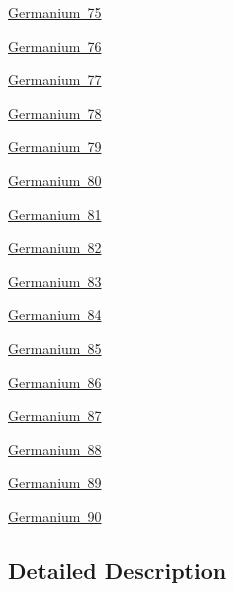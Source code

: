 \begin{DoxyCompactItemize}
\mbox{\hyperlink{group___isotope_const-_germanium-_ge75}{Germanium 75}}
\item 
\mbox{\hyperlink{group___isotope_const-_germanium-_ge76}{Germanium 76}}
\item 
\mbox{\hyperlink{group___isotope_const-_germanium-_ge77}{Germanium 77}}
\item 
\mbox{\hyperlink{group___isotope_const-_germanium-_ge78}{Germanium 78}}
\item 
\mbox{\hyperlink{group___isotope_const-_germanium-_ge79}{Germanium 79}}
\item 
\mbox{\hyperlink{group___isotope_const-_germanium-_ge80}{Germanium 80}}
\item 
\mbox{\hyperlink{group___isotope_const-_germanium-_ge81}{Germanium 81}}
\item 
\mbox{\hyperlink{group___isotope_const-_germanium-_ge82}{Germanium 82}}
\item 
\mbox{\hyperlink{group___isotope_const-_germanium-_ge83}{Germanium 83}}
\item 
\mbox{\hyperlink{group___isotope_const-_germanium-_ge84}{Germanium 84}}
\item 
\mbox{\hyperlink{group___isotope_const-_germanium-_ge85}{Germanium 85}}
\item 
\mbox{\hyperlink{group___isotope_const-_germanium-_ge86}{Germanium 86}}
\item 
\mbox{\hyperlink{group___isotope_const-_germanium-_ge87}{Germanium 87}}
\item 
\mbox{\hyperlink{group___isotope_const-_germanium-_ge88}{Germanium 88}}
\item 
\mbox{\hyperlink{group___isotope_const-_germanium-_ge89}{Germanium 89}}
\item 
\mbox{\hyperlink{group___isotope_const-_germanium-_ge90}{Germanium 90}}
\end{DoxyCompactItemize}


\subsection{Detailed Description}
